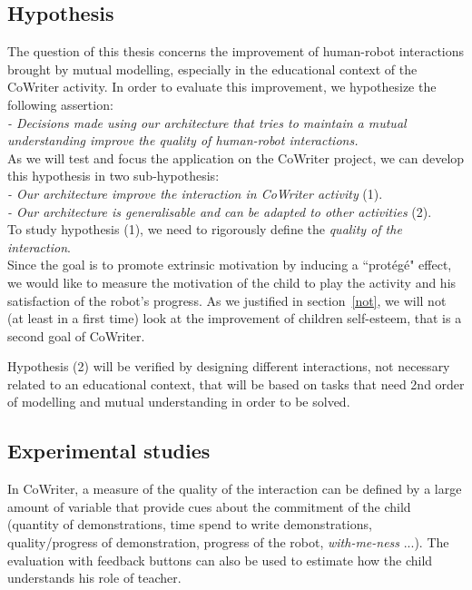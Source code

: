 \documentclass[10pt,a4paper]{article}
\begin{document}
\subsection{Hypothesis}

The question of this thesis concerns the improvement of human-robot interactions brought by mutual modelling, especially in the educational context of the CoWriter activity. In order to evaluate this improvement, we hypothesize the following assertion:\\

\textit{- Decisions made using our architecture that tries to maintain a mutual understanding improve the quality of human-robot interactions.}\\

As we will test and focus the application on the CoWriter project, we can develop this hypothesis in two sub-hypothesis:\\

\textit{- Our architecture improve the interaction in CoWriter activity} (1).\\
\textit{- Our architecture is generalisable and can be adapted to other activities} (2).\\

To study hypothesis (1), we need to rigorously define the \textit{quality of the interaction}.\\
Since the goal is to promote extrinsic motivation by inducing a ``prot\'eg\'e" effect, we would like to measure the motivation of the child to play the activity and his satisfaction of the robot's progress. As we justified in section~\ref{not}, we will not (at least in a first time) look at the improvement of children self-esteem, that is a second goal of CoWriter. 

Hypothesis (2) will be verified by designing different interactions, not necessary related to an educational context, that will be based on tasks that need 2nd order of modelling and mutual understanding in order to be solved.

\subsection{Experimental studies}

In CoWriter, a measure of the quality of the interaction can be defined by a large amount of variable that provide cues about the commitment of the child (quantity of demonstrations, time spend to write demonstrations, quality/progress of demonstration, progress of the robot, \textit{with-me-ness} ...). The evaluation with feedback buttons can also be used to estimate how the child understands his role of teacher.
\end{document}
